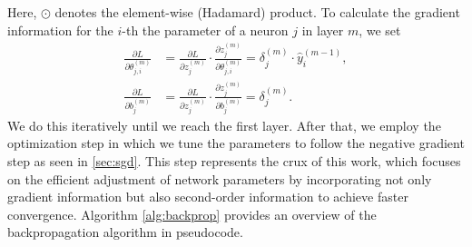Here, $\odot$ denotes the element-wise (Hadamard) product.
To calculate the gradient information for the $i$-th the parameter of a neuron $j$ in layer $m$, we set
\begin{align}
\frac{\partial L}{\partial \theta_{j,i}^{(m)}} &= \frac{\partial L}{\partial z_j^{(m)}} \cdot \frac{\partial z_j^{(m)}}{\partial \theta_{j,i}^{(m)}} = \delta^{(m)}_j \cdot \hat{y}_i^{(m-1)},\\
\frac{\partial L}{\partial b_{j}^{(m)}} &= \frac{\partial L}{\partial z_j^{(m)}} \cdot \frac{\partial z_j^{(m)}}{\partial b_{j}^{(m)}} = \delta^{(m)}_j.
\end{align}
We do this iteratively until we reach the first layer. After that, we employ the optimization step in which we tune
the parameters to follow the negative gradient step as seen in \ref{sec:sgd}.
This step represents the crux of this work, which focuses on the efficient adjustment of network parameters by
incorporating not only gradient information but also second-order information to achieve faster convergence.
Algorithm \ref{alg:backprop} provides an overview of the backpropagation algorithm in pseudocode.


